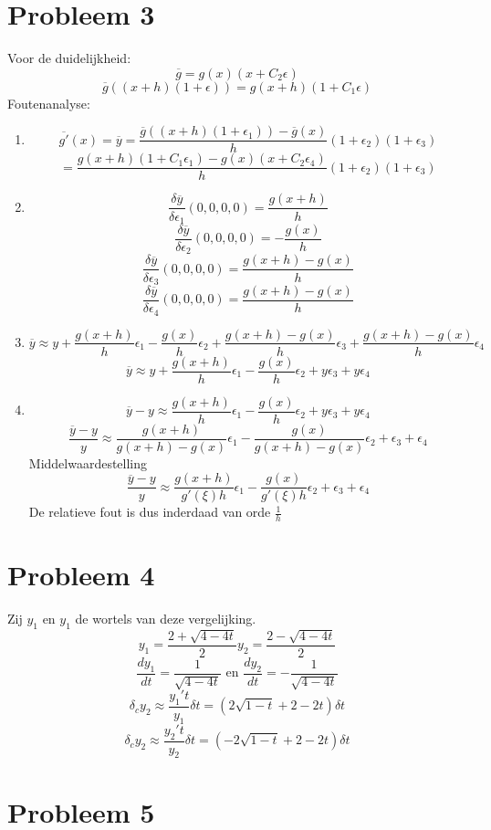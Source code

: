 \documentclass[12pt,a4paper]{article}
\begin{document}
\section{Probleem 3}
Voor de duidelijkheid:
\[
\overline{g} = g(x) (x+C_2\epsilon)
\]
\[
\overline{g}((x+h)(1+\epsilon)) = g(x+h)(1+C_1\epsilon)
\]
Foutenanalyse:
\begin{enumerate}
\item
\[
\overline{g'}(x) = \overline{y} = \frac{\overline{g}((x+h)(1+\epsilon_1))-\overline{g}(x)}{h}(1+\epsilon_2)(1+\epsilon_3)
\]
\[
= \frac{g(x+h)(1+C_1\epsilon_1) - g(x) (x+C_2\epsilon_4)}{h}(1+\epsilon_2)(1+\epsilon_3)
\]
\item
\[
\frac{\delta\overline{y}}{\delta\epsilon_1}(0,0,0,0) = \frac{g(x+h)}{h}
\]
\[
\frac{\delta\overline{y}}{\delta\epsilon_2}(0,0,0,0) = -\frac{g(x)}{h}
\]
\[
\frac{\delta\overline{y}}{\delta\epsilon_3}(0,0,0,0) = \frac{g(x+h) - g(x)}{h}
\]
\[
\frac{\delta\overline{y}}{\delta\epsilon_4}(0,0,0,0) = \frac{g(x+h)-g(x)}{h}
\]
\item
\[
\overline{y} \approx y+
\frac{g(x+h)}{h}\epsilon_1
-\frac{g(x)}{h}\epsilon_2
+\frac{g(x+h) - g(x)}{h}\epsilon_3
+\frac{g(x+h)-g(x)}{h}\epsilon_4
\]
\[
\overline{y} \approx y+
\frac{g(x+h)}{h}\epsilon_1
-\frac{g(x)}{h}\epsilon_2
+y\epsilon_3
+y\epsilon_4
\]
\item
\[
\overline{y} -y \approx
\frac{g(x+h)}{h}\epsilon_1
-\frac{g(x)}{h}\epsilon_2
+y\epsilon_3
+y\epsilon_4
\]
\[
\frac{\overline{y} -y}{y} \approx
\frac{g(x+h)}{g(x+h)-g(x)}\epsilon_1
-\frac{g(x)}{g(x+h)-g(x)}\epsilon_2
+\epsilon_3
+\epsilon_4
\]
Middelwaardestelling
\[
\frac{\overline{y} -y}{y} \approx
\frac{g(x+h)}{g'(\xi)h}\epsilon_1
-\frac{g(x)}{g'(\xi)h}\epsilon_2
+\epsilon_3
+\epsilon_4
\]
De relatieve fout is dus inderdaad van orde $\frac{1}{h}$
\end{enumerate}


\section{Probleem 4}
Zij $y_1$ en $y_1$ de wortels van deze vergelijking.
\[
y_1 = \frac{2 + \sqrt{4 -4t}}{2}
y_2 = \frac{2 - \sqrt{4 -4t}}{2}
\]
\[
\frac{dy_1}{dt} = \frac{1}{\sqrt{4-4t}}
\text{ en }
\frac{dy_2}{dt} = -\frac{1}{\sqrt{4-4t}}
\]
\[
\delta_cy_2 \approx
\frac{y_1't}{y_1}\delta t
= (2\sqrt{1-t} + 2 -2t) \delta t
\]
\[
\delta_cy_2 \approx
\frac{y_2't}{y_2}\delta t
= (-2\sqrt{1-t} + 2 -2t) \delta t
\]

\section{Probleem 5}
\end{document}
